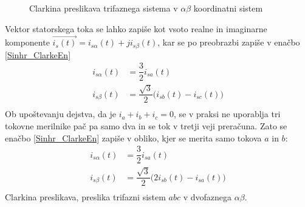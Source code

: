 \documentclass[a4paper,twoside,openright,12pt]{book}
\begin{document}
\begin{figure}[h]
%  
	\caption{\label{Sinhro_Clarke}Clarkina preslikava trifaznega sistema v $\alpha \beta$ koordinatni sistem}
\end{figure}   
Vektor statorskega toka se lahko zapiše kot vsoto realne in imaginarne komponente $\vec{i_s(t)}=i_{s\alpha}(t)+ji_{s\beta}(t)$, kar se po preobrazbi zapiše v enačbo \ref{Sinhr_ClarkeEn}
\begin{equation} \label{Sinhr_ClarkeEn}
\begin{aligned}
i_{s\alpha}(t) &= \dfrac{3}{2}i_{sa}(t)\\[5pt]
i_{s\beta}(t) &= \dfrac{\sqrt{3}}{2}\big(i_{sb}(t)-i_{sc}(t)\big)\\[5pt]
\end{aligned}
\end{equation}
Ob upoštevanju dejstva, da je $i_a+i_b+i_c=0$, se v praksi ne uporablja tri tokovne merilnike pač pa samo dva in se tok v tretji veji preračuna. Zato se enačbo \ref{Sinhr_ClarkeEn} zapiše v obliko, kjer se merita samo tokova $a$ in $b$:
\begin{equation} \label{Sinhr_ClarkeEn2}
\begin{aligned}
i_{s\alpha}(t) &= \dfrac{3}{2}i_{sa}(t)\\[5pt]
i_{s\beta}(t) &= \dfrac{\sqrt{3}}{2}\big(2i_{sb}(t)-i_{sa}(t)\big)\\[5pt]
\end{aligned}
\end{equation}
Clarkina preslikava, preslika trifazni sistem $abc$ v dvofaznega $\alpha \beta$.
\end{document}
